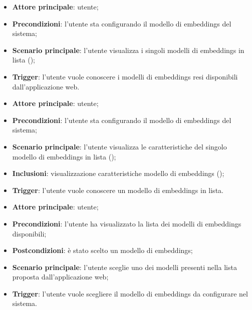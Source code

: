 \documentclass[10pt, a4paper]{article}
\begin{document}
    \begin{itemize}
        \item \textbf{Attore principale}: utente;
        \item \textbf{Precondizioni}: l’utente sta configurando il modello di embeddings del sistema;
        \item \textbf{Scenario principale}: l’utente visualizza i singoli modelli di embeddings in lista ();
        \item \textbf{Trigger}: l’utente vuole conoscere i modelli di embeddings resi disponibili dall’applicazione web.
    \end{itemize}

    \begin{itemize}
        \item \textbf{Attore principale}: utente;
        \item \textbf{Precondizioni}: l’utente sta configurando il modello di embeddings del sistema;
        \item \textbf{Scenario principale}: l'utente visualizza le caratteristiche del singolo modello di embeddings in lista ();
        \item \textbf{Inclusioni}: visualizzazione caratteristiche modello di embeddings ();
        \item \textbf{Trigger}: l’utente vuole conoscere un modello di embeddings in lista.
    \end{itemize}

    \begin{itemize}
        \item \textbf{Attore principale}: utente;
        \item \textbf{Precondizioni}: l’utente ha visualizzato la lista dei modelli di embeddings disponibili;
        \item \textbf{Postcondizioni}: è stato scelto un modello di embeddings;
        \item \textbf{Scenario principale}: l’utente sceglie uno dei modelli presenti nella lista proposta dall’applicazione web;
        \item \textbf{Trigger}: l’utente vuole scegliere il modello di embeddings da configurare nel sistema.
    \end{itemize}
\end{document}
